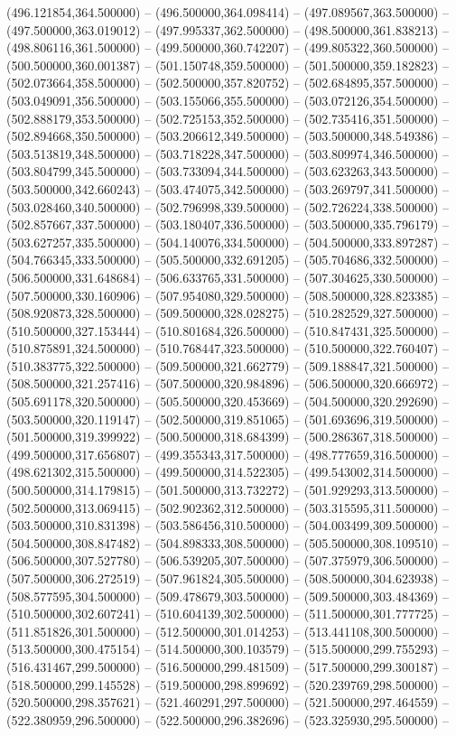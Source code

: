 (496.121854,364.500000) -- (496.500000,364.098414) -- (497.089567,363.500000) -- (497.500000,363.019012) -- (497.995337,362.500000) -- (498.500000,361.838213) -- (498.806116,361.500000) -- (499.500000,360.742207) -- (499.805322,360.500000) -- (500.500000,360.001387) -- (501.150748,359.500000) -- (501.500000,359.182823) -- (502.073664,358.500000) -- (502.500000,357.820752) -- (502.684895,357.500000) -- (503.049091,356.500000) -- (503.155066,355.500000) -- (503.072126,354.500000) -- (502.888179,353.500000) -- (502.725153,352.500000) -- (502.735416,351.500000) -- (502.894668,350.500000) -- (503.206612,349.500000) -- (503.500000,348.549386) -- (503.513819,348.500000) -- (503.718228,347.500000) -- (503.809974,346.500000) -- (503.804799,345.500000) -- (503.733094,344.500000) -- (503.623263,343.500000) -- (503.500000,342.660243) -- (503.474075,342.500000) -- (503.269797,341.500000) -- (503.028460,340.500000) -- (502.796998,339.500000) -- (502.726224,338.500000) -- (502.857667,337.500000) -- (503.180407,336.500000) -- (503.500000,335.796179) -- (503.627257,335.500000) -- (504.140076,334.500000) -- (504.500000,333.897287) -- (504.766345,333.500000) -- (505.500000,332.691205) -- (505.704686,332.500000) -- (506.500000,331.648684) -- (506.633765,331.500000) -- (507.304625,330.500000) -- (507.500000,330.160906) -- (507.954080,329.500000) -- (508.500000,328.823385) -- (508.920873,328.500000) -- (509.500000,328.028275) -- (510.282529,327.500000) -- (510.500000,327.153444) -- (510.801684,326.500000) -- (510.847431,325.500000) -- (510.875891,324.500000) -- (510.768447,323.500000) -- (510.500000,322.760407) -- (510.383775,322.500000) -- (509.500000,321.662779) -- (509.188847,321.500000) -- (508.500000,321.257416) -- (507.500000,320.984896) -- (506.500000,320.666972) -- (505.691178,320.500000) -- (505.500000,320.453669) -- (504.500000,320.292690) -- (503.500000,320.119147) -- (502.500000,319.851065) -- (501.693696,319.500000) -- (501.500000,319.399922) -- (500.500000,318.684399) -- (500.286367,318.500000) -- (499.500000,317.656807) -- (499.355343,317.500000) -- (498.777659,316.500000) -- (498.621302,315.500000) -- (499.500000,314.522305) -- (499.543002,314.500000) -- (500.500000,314.179815) -- (501.500000,313.732272) -- (501.929293,313.500000) -- (502.500000,313.069415) -- (502.902362,312.500000) -- (503.315595,311.500000) -- (503.500000,310.831398) -- (503.586456,310.500000) -- (504.003499,309.500000) -- (504.500000,308.847482) -- (504.898333,308.500000) -- (505.500000,308.109510) -- (506.500000,307.527780) -- (506.539205,307.500000) -- (507.375979,306.500000) -- (507.500000,306.272519) -- (507.961824,305.500000) -- (508.500000,304.623938) -- (508.577595,304.500000) -- (509.478679,303.500000) -- (509.500000,303.484369) -- (510.500000,302.607241) -- (510.604139,302.500000) -- (511.500000,301.777725) -- (511.851826,301.500000) -- (512.500000,301.014253) -- (513.441108,300.500000) -- (513.500000,300.475154) -- (514.500000,300.103579) -- (515.500000,299.755293) -- (516.431467,299.500000) -- (516.500000,299.481509) -- (517.500000,299.300187) -- (518.500000,299.145528) -- (519.500000,298.899692) -- (520.239769,298.500000) -- (520.500000,298.357621) -- (521.460291,297.500000) -- (521.500000,297.464559) -- (522.380959,296.500000) -- (522.500000,296.382696) -- (523.325930,295.500000) -- 